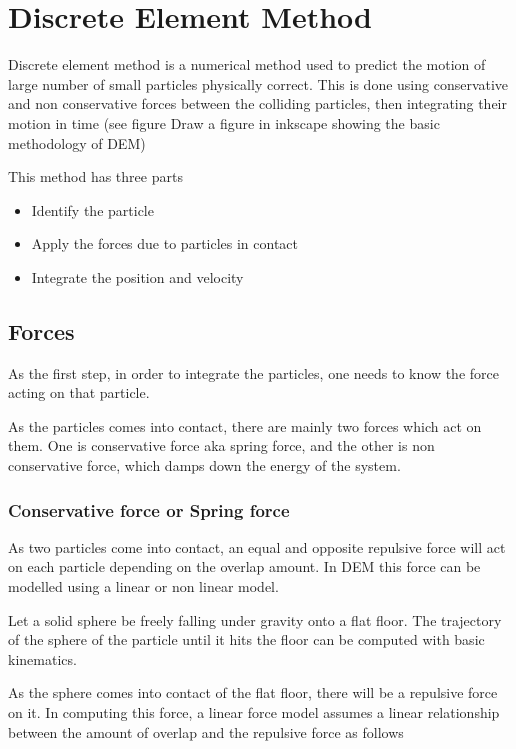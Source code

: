 \chapter{Discrete Element Method}


Discrete element method is a numerical method used to predict the
motion of large number of small particles physically correct. This is
done using conservative and non conservative forces between the
colliding particles, then integrating their motion in time (see figure
Draw a figure in inkscape showing the basic methodology of DEM)

This method has three parts
\begin{itemize}
\item Identify the particle
\item Apply the forces due to particles in contact
\item Integrate the position and velocity
\end{itemize}


\section{Forces}
\label{sec:forces}

As the first step, in order to integrate the particles, one needs to
know the force acting on that particle.

As the particles comes into contact, there are mainly two forces which
act on them.  One is conservative force aka spring force, and the
other is non conservative force, which damps down the energy of the
system.


\subsection{Conservative force or Spring force}

As two particles come into contact, an equal and opposite repulsive
force will act on each particle depending on the overlap amount. In
DEM this force can be modelled using a linear or non linear model.


Let a solid sphere be freely falling under gravity onto a flat floor.
The trajectory of the sphere of the particle until it hits the floor
can be computed with basic kinematics.

As the sphere comes into contact of the flat floor, there will be a
repulsive force on it. In computing this force, a linear force model
assumes a linear relationship between the amount of overlap and the
repulsive force as follows



